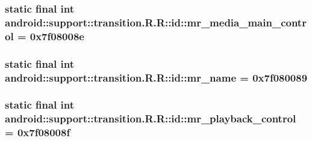 \hypertarget{classandroid_1_1support_1_1transition_1_1_r_1_1id_4709e3bffc270c16539e121896fae193}{
\subsubsection[{mr\_\-media\_\-main\_\-control}]{\setlength{\rightskip}{0pt plus 5cm}static final int android::support::transition.R.R::id::mr\_\-media\_\-main\_\-control = 0x7f08008e}}
\label{classandroid_1_1support_1_1transition_1_1_r_1_1id_4709e3bffc270c16539e121896fae193}


\hypertarget{classandroid_1_1support_1_1transition_1_1_r_1_1id_4dcf6cc60a7a5fb2b572e8a45f841e78}{
\subsubsection[{mr\_\-name}]{\setlength{\rightskip}{0pt plus 5cm}static final int android::support::transition.R.R::id::mr\_\-name = 0x7f080089}}
\label{classandroid_1_1support_1_1transition_1_1_r_1_1id_4dcf6cc60a7a5fb2b572e8a45f841e78}


\hypertarget{classandroid_1_1support_1_1transition_1_1_r_1_1id_999bc57c022ae09558b05add521de8fb}{
\subsubsection[{mr\_\-playback\_\-control}]{\setlength{\rightskip}{0pt plus 5cm}static final int android::support::transition.R.R::id::mr\_\-playback\_\-control = 0x7f08008f}}
\label{classandroid_1_1support_1_1transition_1_1_r_1_1id_999bc57c022ae09558b05add521de8fb}


